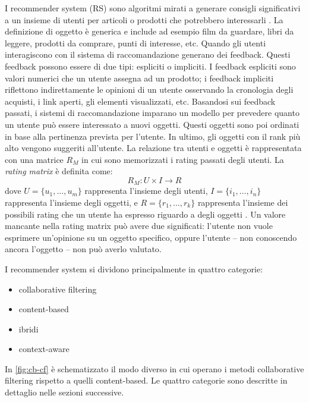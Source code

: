 I recommender system (RS) sono algoritmi mirati a generare consigli significativi a un insieme di utenti per articoli o prodotti che potrebbero interessarli \cite{recsys-definition}. La definizione di oggetto è generica e include ad esempio film da guardare, libri da leggere, prodotti da comprare, punti di interesse, etc. 
Quando gli utenti interagiscono con il sistema di raccomandazione generano dei feedback. Questi feedback possono essere di due tipi: espliciti o impliciti. I feedback espliciti sono valori numerici che un utente assegna ad un prodotto; i feedback impliciti riflettono indirettamente le opinioni di un utente osservando la cronologia degli acquisti, i link aperti, gli elementi visualizzati, etc.
Basandosi sui feedback passati, i sistemi di raccomandazione imparano un modello per prevedere quanto un utente può essere interessato a nuovi oggetti. Questi oggetti sono poi ordinati in base alla pertinenza prevista per l'utente. In ultimo, gli oggetti con il rank più alto vengono suggeriti all'utente. La relazione tra utenti e oggetti è rappresentata con una matrice $R_M$ in cui sono memorizzati i rating passati degli utenti.
La \textit{rating matrix} è definita come: 
$$
R_M: U \times I \rightarrow R
$$
dove $U = \{u_1, \dots, u_m\}$ rappresenta l'insieme degli utenti, $I = \{i_1,\dots, i_n\}$ rappresenta l'insieme degli oggetti, e $R = \{r_1, \dots, r_k\}$ rappresenta l'insieme dei possibili rating che un utente ha espresso riguardo a degli oggetti \cite{survey-mattia}. Un valore mancante nella rating matrix può avere due significati: l'utente non vuole esprimere un'opinione su un oggetto specifico, oppure l'utente -- non conoscendo ancora l'oggetto -- non può averlo valutato.

\vspace{5mm}
\noindent I recommender system si dividono principalmente in quattro categorie:
\begin{itemize}
	\item collaborative filtering
	\item content-based
	\item ibridi
	\item context-aware
\end{itemize}

\noindent In \autoref{fig:cb-cf} è schematizzato il modo diverso in cui operano i metodi collaborative filtering rispetto a quelli content-based. Le quattro categorie sono descritte in dettaglio nelle sezioni successive.

